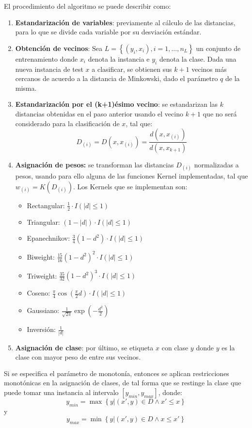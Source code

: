 El procedimiento del algoritmo se puede describir como:
\begin{enumerate}
	\item \textbf{Estandarización de variables}: previamente al cálculo de las distancias, para lo que se divide cada variable por su desviación estándar.
	\item \textbf{Obtención de vecinos}: Sea $L= \left\{ (y_i,x_i), i=1,...,n_L \right\}$ un conjunto de entrenamiento donde $x_i$ denota la instancia e $y_i$ denota la clase. Dada una nueva instancia de test $x$ a clasificar, se obtienen sus $k+1$ vecinos más cercanos de acuerdo a la distancia de Minkowski, dado el parámetro $q$ de la misma.
	\item \textbf{Estandarización por el (k+1)ésimo vecino}: se estandarizan las $k$ distancias obtenidas en el paso anterior usando el vecino $k+1$ que no será considerado para la clasificación de  $x$, tal que:
	$$D_{(i)}=D(x,x_{(i)})= \frac{d(x,x_{(i)})}{d(x,x_{k+1})}$$
	\item \textbf{Asignación de pesos:} se transforman las distancias $D_{(i)}$ normalizadas a pesos, usando para ello alguna de las funciones Kernel implementadas, tal que $w_{(i)}=K(D_{(i)})$. Los Kernels que se implementan son: 
	\begin{itemize}
		\item Rectangular: $\frac{1}{2} \cdot I(|d|\leq 1)$
		\item Triangular: $(1 - |d|) \cdot I(|d| \leq 1)$
		\item Epanechnikov: $\frac{3}{4}(1 - d^2) \cdot I(|d| \leq 1)$
		\item Biweight: $\frac{15}{16} (1 - d^2)^2 \cdot I(|d| \leq 1)$
		\item Triweight: $\frac{35}{32} (1-d^2)^3 \cdot I(|d| \leq 1)$
		\item Coseno: $\frac{\pi}{4} \cos(\frac{\pi}{2}d) \cdot I(|d| \leq 1)$
		\item Gaussiano: $\frac{1}{\sqrt{2 \pi}} \exp(- \frac{d^2}{2})$
		\item Inversión: $\frac{1}{|d|}$
	\end{itemize}
		\item  \textbf{Asignación de clase}: por último, se etiqueta $x$ con clase $y$ donde $y$ es la clase con mayor peso de entre sus vecinos.
\end{enumerate}

Si se especifica el parámetro de monotonía, entonces se aplican restricciones monotónicas en la asignación de clases, de tal forma que se restinge la clase que puede tomar una instancia al intervalo $\left[y_{min},y_{max}\right]$, donde:
$$y_{min}=\max \left\{ y | (x',y) \in D \land x' \leq x \right\}$$
y
$$y_{max}=\min \left\{ y | (x',y) \in D \land x \leq x' \right\}$$

